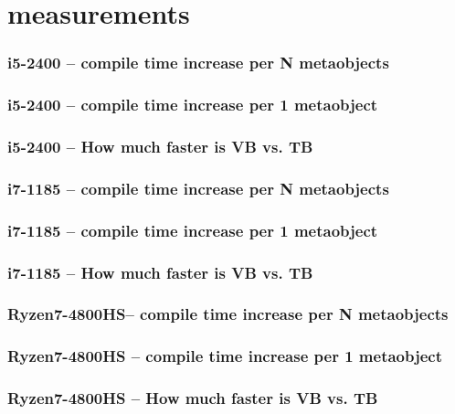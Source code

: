 \documentclass[compress,table,xcolor=table]{beamer}
\begin{document}
\section{measurements}
\begin{frame}
  \frametitle{i5-2400 -- compile time increase per N metaobjects}
\end{frame}
\begin{frame}
  \frametitle{i5-2400 -- compile time increase per 1 metaobject}
\end{frame}
\begin{frame}
  \frametitle{i5-2400 -- How much faster is VB vs. TB}
\end{frame}
\begin{frame}
  \frametitle{i7-1185 -- compile time increase per N metaobjects}
\end{frame}
\begin{frame}
  \frametitle{i7-1185 -- compile time increase per 1 metaobject}
\end{frame}
\begin{frame}
  \frametitle{i7-1185 -- How much faster is VB vs. TB}
\end{frame}
\begin{frame}
  \frametitle{Ryzen7-4800HS-- compile time increase per N metaobjects}
\end{frame}
\begin{frame}
  \frametitle{Ryzen7-4800HS -- compile time increase per 1 metaobject}
\end{frame}
\begin{frame}
  \frametitle{Ryzen7-4800HS -- How much faster is VB vs. TB}
\end{frame}
\end{document}

